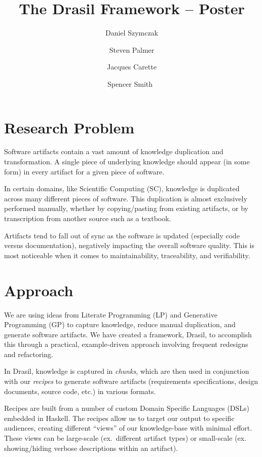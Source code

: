 \documentclass[twocolumn, 10pt]{article} %
\title{The Drasil Framework -- Poster}
\author{
  Daniel Szymczak
  \and
  Steven Palmer
  \and
  Jacques Carette
  \and
  Spencer Smith\
}
\begin{document}
\maketitle

\section{Research Problem}

Software artifacts contain a vast amount of knowledge duplication and
transformation. A single piece of underlying knowledge should appear (in some
form) in every artifact for a given piece of software.

In certain domains,
like Scientific Computing (SC),
knowledge is duplicated across many different pieces of software. This
duplication is almost exclusively performed manually, whether by copying/pasting
from existing artifacts, or by transcription from another source such as a textbook.

Artifacts tend to fall out of sync as the software is updated 
(especially code versus documentation),
negatively impacting the overall software quality. This is most noticeable 
when it comes to maintainability, traceability, and verifiability.

\section{Approach}

We are using ideas from Literate Programming (LP) and Generative Programming
(GP) to capture knowledge, reduce manual duplication, and generate software
artifacts. We have created a framework, Drasil, to accomplish this through a
practical, example-driven approach involving frequent redesigns and refactoring.

In Drasil, knowledge is captured in \textit{chunks}, which are then used in
conjunction with our \textit{recipes} to generate software artifacts
(requirements specifications, design documents, source code, etc.) in various
formats.

Recipes are built from a number of custom Domain Specific Languages (DSLs)
embedded in Haskell. The recipes allow us to target our output to specific
audiences, creating different ``views'' of our knowledge-base with minimal
effort. These views can be large-scale (ex.\ different artifact types) or
small-scale (ex. showing/hiding verbose descriptions within an artifact).
\end{document}
